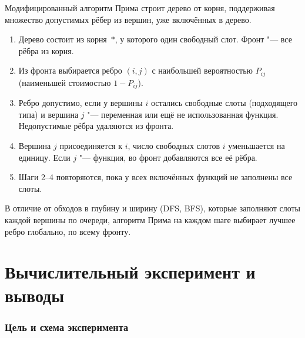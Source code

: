\documentclass[12pt]{article}
\begin{document}
Модифицированный алгоритм Прима строит дерево от корня, поддерживая множество допустимых рёбер из вершин, уже включённых в дерево.
\begin{enumerate}[nosep]
\item Дерево состоит из корня~$\ast$, у которого один свободный слот. Фронт "--- все рёбра из корня.
\item Из фронта выбирается ребро $(i,j)$ с наибольшей вероятностью $P_{ij}$ (наименьшей стоимостью $1-P_{ij}$).
\item Ребро допустимо, если у вершины $i$ остались свободные слоты (подходящего типа) и вершина $j$ "--- переменная или ещё не использованная функция. Недопустимые рёбра удаляются из фронта.
\item Вершина $j$ присоединяется к $i$, число свободных слотов $i$ уменьшается на единицу. Если $j$ "--- функция, во фронт добавляются все её рёбра.
\item Шаги 2--4 повторяются, пока у всех включённых функций не заполнены все слоты.
\end{enumerate}
В отличие от обходов в глубину и ширину (DFS, BFS), которые заполняют слоты каждой вершины по очереди, алгоритм Прима на каждом шаге выбирает лучшее ребро глобально, по всему фронту.

\part{Вычислительный эксперимент и выводы}

\section{Цель и схема эксперимента}
\end{document}
